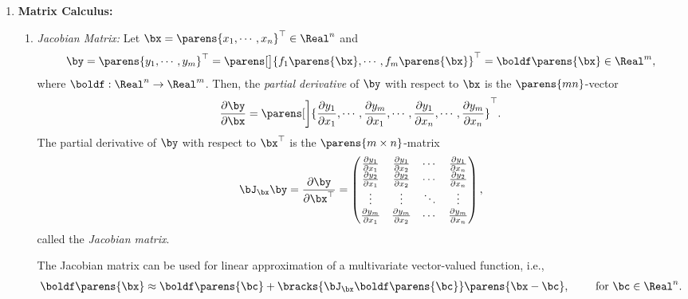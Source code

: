 \documentclass[12pt]{article}
\begin{document}
\begin{enumerate}[label=\textbf{\arabic*.}]
	\item \textbf{Matrix Calculus:} 
	\begin{enumerate}
		\item \textit{Jacobian Matrix:} Let $\bx = \parens{x_1, \cdots, x_n}^\top \in \Real^n$ and 
		\begin{align*}
			\by = \parens{y_1, \cdots, y_m}^\top = \parens[\big]{f_1 \parens{\bx}, \cdots, f_m \parens{\bx}}^\top = \boldf \parens{\bx} \in \Real^m, 
		\end{align*}
		where $\boldf: \Real^n \to \Real^m$. Then, the \textit{partial derivative} of $\by$ with respect to $\bx$ is the $\parens{mn}$-vector 
		\begin{align*}
			\frac{\partial \by}{\partial \bx} = \parens[\bigg]{\frac{\partial y_1}{\partial x_1}, \cdots, \frac{\partial y_m}{\partial x_1}, \cdots, \frac{\partial y_1}{\partial x_n}, \cdots, \frac{\partial y_m}{\partial x_n}}^\top. 
		\end{align*}
		The partial derivative of $\by$ with respect to $\bx^\top$ is the $\parens{m \times n}$-matrix 
		\begin{align*}
			\bJ_{\bx} \by = \frac{\partial \by}{\partial \bx^\top} = 
			\begin{pmatrix}
				\frac{\partial y_1}{\partial x_1} & \frac{\partial y_1}{\partial x_2} & \cdots & \frac{\partial y_1}{\partial x_n} \\ 
				\frac{\partial y_2}{\partial x_1} & \frac{\partial y_2}{\partial x_2} & \cdots & \frac{\partial y_2}{\partial x_n} \\
				\vdots & \vdots & \ddots & \vdots \\
				\frac{\partial y_m}{\partial x_1} & \frac{\partial y_m}{\partial x_2} & \cdots & \frac{\partial y_m}{\partial x_n} 
			\end{pmatrix}, 
		\end{align*}
		called the \textit{Jacobian matrix}. 
		
		The Jacobian matrix can be used for linear approximation of a multivariate vector-valued function, i.e., 
		\begin{align*}
			\boldf \parens{\bx} \approx \boldf \parens{\bc} + \bracks{\bJ_{\bx} \boldf \parens{\bc}} \parens{\bx - \bc}, \qquad \text{ for } \bc \in \Real^n. 
		\end{align*}
		
		

\end{enumerate}
\end{enumerate}
\end{document}
